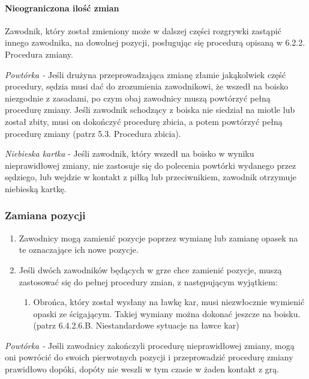 \documentclass[12pt]{article}
\begin{document}
\paragraph{Nieograniczona ilość zmian}
Zawodnik, który został
zmieniony może w dalszej części rozgrywki zastąpić innego zawodnika, na
dowolnej pozycji, posługując się procedurą opisaną w 6.2.2. Procedura
zmiany.

\emph{Powtórka -} Jeśli drużyna przeprowadzająca zmianę złamie
jakąkolwiek część procedury, sędzia musi dać do zrozumienia zawodnikowi,
że wszedł na boisko niezgodnie z zasadami, po czym obaj zawodnicy muszą
powtórzyć pełną procedurę zmiany. Jeśli zawodnik schodzący z boiska nie
siedział na miotle lub został zbity, musi on dokończyć procedurę zbicia,
a potem powtórzyć pełną procedurę zmiany (patrz 5.3. Procedura zbicia).

\emph{Niebieska kartka} - Jeśli zawodnik, który wszedł na boisko w
wyniku nieprawidłowej zmiany, nie zastosuje się do polecenia powtórki
wydanego przez sędziego, lub wejdzie w kontakt z piłką lub
przeciwnikiem, zawodnik otrzymuje niebieską kartkę.

\subsubsection{Zamiana pozycji}

\begin{enumerate}
	\item
	      Zawodnicy mogą zamienić pozycje poprzez wymianę lub zamianę opasek na
	      te oznaczające ich nowe pozycje.
	\item
	      Jeśli dwóch zawodników będących w grze chce zamienić pozycje, muszą
	      zastosować się do pełnej procedury zmian, z następującym wyjątkiem:

	      \begin{enumerate}
		      \item
		            Obrońca, który został wysłany na ławkę kar, musi niezwłocznie
		            wymienić opaski ze ścigającym. Takiej wymiany można dokonać jeszcze
		            na boisku. (patrz 6.4.2.6.B. Niestandardowe sytuacje na ławce kar)
	      \end{enumerate}
\end{enumerate}

\emph{Powtórka -} Jeśli zawodnicy zakończyli procedurę nieprawidłowej
zmiany, mogą oni powrócić do swoich pierwotnych pozycji i przeprowadzić
procedurę zmiany prawidłowo dopóki, dopóty nie weszli w
tym czasie w żaden kontakt z grą.
\end{document}
